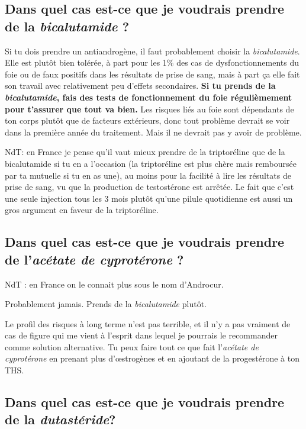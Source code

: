 \documentclass{article}
\begin{document}
\subsection{Dans quel cas est-ce que je voudrais prendre de la \textit{bicalutamide} ?}

Si tu dois prendre un antiandrogène, il faut probablement choisir la \textit{bicalutamide}. Elle est plutôt bien tolérée, à part pour les 1\% des cas de dysfonctionnements du foie ou de faux positifs dans les résultats de prise de sang, mais à part ça elle fait son travail avec relativement peu d'effets secondaires. \textbf{Si tu prends de la \textit{bicalutamide}, fais des tests de fonctionnement du foie régulièmement pour t'assurer que tout va bien.} Les risques liés au foie sont dépendants de ton corps plutôt que de facteurs extérieurs, donc tout problème devrait se voir dans la première année du traitement. Mais il ne devrait pas y avoir de problème.

NdT: en France je pense qu'il vaut mieux prendre de la triptoréline que de la bicalutamide si tu en a l'occasion (la triptoréline est plus chère mais remboursée par ta mutuelle si tu en as une), au moins pour la facilité à lire les résultats de prise de sang, vu que la production de testostérone est arrêtée. Le fait que c'est une seule injection tous les 3 mois plutôt qu'une pilule quotidienne est aussi un gros argument en faveur de la triptoréline.

\subsection{Dans quel cas est-ce que je voudrais prendre de l'\textit{acétate de cyprotérone} ?}

NdT : en France on le connait plus sous le nom d'Androcur.

Probablement jamais. Prends de la \textit{bicalutamide} plutôt.

Le profil des risques à long terme n'est pas terrible, et il n'y a pas vraiment de cas de figure qui me vient à l'esprit dans lequel je pourrais le recommander comme solution alternative. Tu peux faire tout ce que fait l'\textit{acétate de cyprotérone} en prenant plus d'œstrogènes et en ajoutant de la progestérone à ton THS.

\subsection{Dans quel cas est-ce que je voudrais prendre de la \textit{dutastéride}?}
\end{document}
